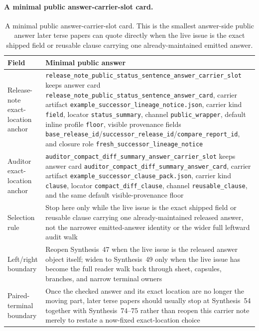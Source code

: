 \documentclass[11pt]{article}
\begin{document}
\paragraph{A minimal public answer-carrier-slot card.}
\begin{table}[t]
\centering
\small
\begin{tabularx}{\linewidth}{@{}lX@{}}
\toprule
Field & Minimal public answer \\
\midrule
Release-note exact-location anchor & \nolinkurl{release_note_public_status_sentence_answer_carrier_slot} keeps answer card \nolinkurl{release_note_public_status_sentence_answer_card}, carrier artifact \nolinkurl{example_successor_lineage_notice.json}, carrier kind \texttt{field}, locator \nolinkurl{status_summary}, channel \texttt{public_wrapper}, default inline profile \texttt{floor}, visible provenance fields \nolinkurl{base_release_id}/\nolinkurl{successor_release_id}/\nolinkurl{compare_report_id}, and closure role \nolinkurl{fresh_successor_lineage_notice} \\
Auditor exact-location anchor & \nolinkurl{auditor_compact_diff_summary_answer_carrier_slot} keeps answer card \nolinkurl{auditor_compact_diff_summary_answer_card}, carrier artifact \nolinkurl{example_successor_clause_pack.json}, carrier kind \texttt{clause}, locator \nolinkurl{compact_diff_clause}, channel \texttt{reusable_clause}, and the same default visible-provenance floor \\
Selection rule & Stop here only while the live issue is the exact shipped field or reusable clause carrying one already-maintained released answer, not the narrower emitted-answer identity or the wider full leftward audit walk \\
Left/right boundary & Reopen Synthesis~47 when the live issue is the released answer object itself; widen to Synthesis~49 only when the live issue has become the full reader walk back through sheet, capsules, branches, and narrow terminal owners \\
Paired-terminal boundary & Once the checked answer and its exact location are no longer the moving part, later terse papers should usually stop at Synthesis~54 together with Synthesis~74--75 rather than reopen this carrier note merely to restate a now-fixed exact-location choice \\
\bottomrule
\end{tabularx}
\caption{A minimal public answer-carrier-slot card. This is the smallest answer-side public answer later terse papers can quote directly when the live issue is the exact shipped field or reusable clause carrying one already-maintained emitted answer.}
\label{tab:minimal-public-answer-carrier-slot-card}
\end{table}
\end{document}
